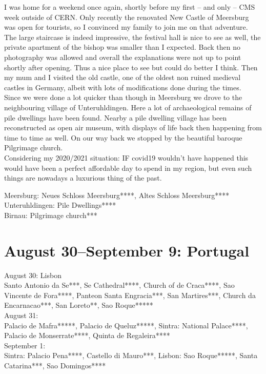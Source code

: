 I was home for a weekend once again, shortly before my first -- and only -- CMS week outside of CERN. Only recently the renovated New Castle of Meersburg was open for tourists, so I convinced my family to join me on that adventure. The large staircase is indeed impressive, the festival hall is nice to see as well, the private apartment of the bishop was smaller than I expected. Back then no photography was allowed and overall the explanations were not up to point shortly after opening. Thus a nice place to see but could do better I think. Then my mum and I visited the old castle, one of the oldest non ruined medieval castles in Germany, albeit with lots of modifications done during the times.\\
Since we were done a lot quicker than though in Meersburg we drove to the neighbouring village of Unteruhldingen. Here a lot of archaeological remains of pile dwellings have been found. Nearby a pile dwelling village has been reconstructed as open air museum, with displays of life back then happening from time to time as well. On our way back we stopped by the beautiful baroque Pilgrimage church.\\
Considering my 2020/2021 situation: IF covid19 wouldn't have happened this would have been a perfect affordable day to spend in my region, but even such things are nowadays a luxurious thing of the past.

Meersburg: Neues Schloss Meersburg****, Altes Schloss Meersburg****\\
Unteruhldingen: Pile Dwellings****\\
Birnau: Pilgrimage church***

\section{August 30--September 9: Portugal}
\label{Portugal2012}

August 30: Lisbon\\
Santo Antonio da Se***, Se Cathedral****, Church of de Craca****, Sao Vincente de Fora****,  Panteon Santa Engracia***, San Martires***, Church da Encarnacao***, San Loreto**, Sao Roque*****\\

August 31:\\
Palacio de Mafra*****, Palacio de Queluz*****, Sintra: National Palace****, Palacio de Monserrate****, Quinta de Regaleira****\\

September 1:\\
Sintra: Palacio Pena****, Castello di Mauro***, Lisbon: Sao Roque*****, Santa Catarina***, Sao Domingos****\\

